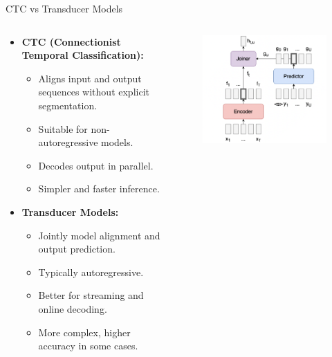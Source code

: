 \begin{frame}{CTC vs Transducer Models}
    \begin{columns}
        \begin{column}{0.6\textwidth}
            \begin{itemize}
                \setlength{\itemsep}{1.5em}
                \item \textbf{CTC (Connectionist Temporal Classification):}
                \begin{itemize}
                    \item Aligns input and output sequences without explicit segmentation.
                    \item Suitable for non-autoregressive models.
                    \item Decodes output in parallel.
                    \item Simpler and faster inference.
                \end{itemize}
                \item \textbf{Transducer Models:}
                \begin{itemize}
                    \item Jointly model alignment and output prediction.
                    \item Typically autoregressive.
                    \item Better for streaming and online decoding.
                    \item More complex, higher accuracy in some cases.
                \end{itemize}
            \end{itemize}
        \end{column}
        \begin{column}{0.5\textwidth}
            \begin{figure}
                \centering
                \includegraphics[width=\textwidth]{images/audio-nlp/transducer.png}

\end{figure}
\end{column}
\end{columns}
\end{frame}
